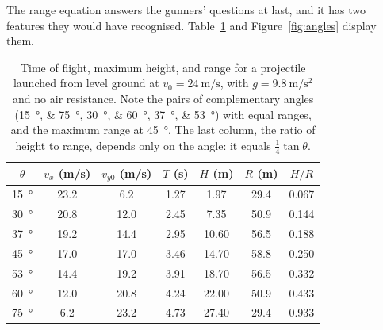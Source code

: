 \documentclass[11pt,twoside,openany]{book}
\begin{document}
The range equation answers the gunners' questions at last, and it has two features they would have recognised. Table~\ref{tab:angles} and Figure~\ref{fig:angles} display them.

\begin{table}[htb]
\centering
\caption{Time of flight, maximum height, and range for a projectile launched from level ground at $v_0 = \SI{24}{\metre\per\second}$, with $g = \SI{9.8}{\metre\per\second\squared}$ and no air resistance. Note the pairs of complementary angles (\SIlist{15;75}{\degree}, \SIlist{30;60}{\degree}, \SIlist{37;53}{\degree}) with equal ranges, and the maximum range at \SI{45}{\degree}. The last column, the ratio of height to range, depends only on the angle: it equals $\tfrac14\tan\theta$.}
\label{tab:angles}
\renewcommand{\arraystretch}{1.2}
\small
\begin{tabular}{ccccccc}
\toprule
$\theta$ & $v_x$ (m/s) & $v_{y0}$ (m/s) & $T$ (s) & $H$ (m) & $R$ (m) & $H/R$ \\
\midrule
\SI{15}{\degree} & 23.2 & 6.2 & 1.27 & 1.97 & 29.4 & 0.067 \\
\SI{30}{\degree} & 20.8 & 12.0 & 2.45 & 7.35 & 50.9 & 0.144 \\
\SI{37}{\degree} & 19.2 & 14.4 & 2.95 & 10.60 & 56.5 & 0.188 \\
\SI{45}{\degree} & 17.0 & 17.0 & 3.46 & 14.70 & 58.8 & 0.250 \\
\SI{53}{\degree} & 14.4 & 19.2 & 3.91 & 18.70 & 56.5 & 0.332 \\
\SI{60}{\degree} & 12.0 & 20.8 & 4.24 & 22.00 & 50.9 & 0.433 \\
\SI{75}{\degree} & 6.2 & 23.2 & 4.73 & 27.40 & 29.4 & 0.933 \\
\bottomrule
\end{tabular}
\end{table}
\end{document}
